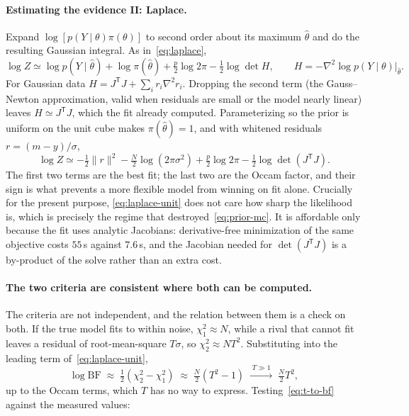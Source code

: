 \documentclass[10pt]{article}
\begin{document}
\paragraph{Estimating the evidence II: Laplace.}
Expand $\log[p(Y\mid\theta)\pi(\theta)]$ to second order about its maximum $\hat\theta$ and do
the resulting Gaussian integral. As in~\eqref{eq:laplace},
%
\begin{equation}
\log Z \simeq \log p(Y \mid \hat\theta)
 + \log \pi(\hat\theta)
 + \tfrac{p}{2}\log 2\pi
 - \tfrac12 \log \det H ,
\qquad
H = -\nabla^2 \log p(Y\mid\theta)\big|_{\hat\theta}.
\label{eq:laplace-evidence}
\end{equation}
%
For Gaussian data $H = J^{\mathsf T}J + \sum_i r_i \nabla^2 r_i$. Dropping the second term (the Gauss--Newton approximation, valid when residuals are small or the model nearly linear) leaves $H \simeq J^{\mathsf T}J$, which the fit already computed. Parameterizing so the prior is
uniform on the unit cube makes $\pi(\hat\theta) = 1$, and with whitened residuals
$r = (m - y)/\sigma$,
%
\begin{equation}
\log Z \simeq
-\tfrac12 \lVert r \rVert^2
-\tfrac{N}{2}\log\!\left(2\pi\sigma^2\right)
+\tfrac{p}{2}\log 2\pi
-\tfrac12 \log \det\!\left(J^{\mathsf T}J\right).
\label{eq:laplace-unit}
\end{equation}
%
The first two terms are the best fit; the last two are the Occam factor, and their sign is
what prevents a more flexible model from winning on fit alone. Crucially
for the present purpose, \eqref{eq:laplace-unit} does not care how sharp the likelihood is,
which is precisely the regime that destroyed~\eqref{eq:prior-mc}. It is affordable only
because the fit uses analytic Jacobians: derivative-free minimization of the same objective
costs $55$\,s against $7.6$\,s, and the Jacobian needed for $\det(J^{\mathsf T}J)$ is a
by-product of the solve rather than an extra cost.

\paragraph{The two criteria are consistent where both can be computed.}
The criteria are not independent, and the relation between them is a check on both. If the
true model fits to within noise, $\chi^2_1 \approx N$, while a rival that cannot fit leaves a
residual of root-mean-square $T\sigma$, so $\chi^2_2 \approx N T^2$. Substituting into the
leading term of~\eqref{eq:laplace-unit},
%
\begin{equation}
\log \mathrm{BF} \;\approx\; \tfrac12\left(\chi^2_2 - \chi^2_1\right)
\;\approx\; \tfrac{N}{2}\left(T^2 - 1\right)
\;\xrightarrow{\;T \gg 1\;}\; \tfrac{N}{2}T^2 ,
\label{eq:t-to-bf}
\end{equation}
%
up to the Occam terms, which $T$ has no way to express. Testing~\eqref{eq:t-to-bf} against
the measured values:
\end{document}
